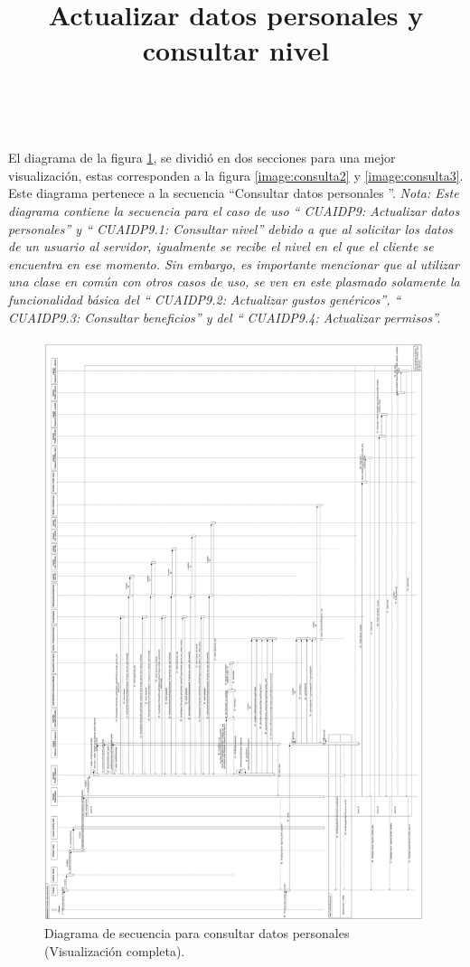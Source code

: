 \title{\textbf{Actualizar datos personales y consultar nivel}}
\\ \par
El diagrama de la figura \ref{image:consulta1}, se dividió en dos secciones para una mejor visualización, estas corresponden a la figura \ref{image:consulta2} y \ref{image:consulta3}. Este diagrama pertenece a la secuencia ``Consultar datos personales ''. 
\textit{Nota: Este diagrama contiene la secuencia para el caso de uso `` CUAIDP9: Actualizar datos personales'' y `` CUAIDP9.1: Consultar nivel'' debido a que al solicitar los datos de un usuario al servidor, igualmente se recibe el nivel en el que el cliente se encuentra en ese momento. Sin embargo, es importante mencionar que al utilizar una clase en común con otros casos de uso, se ven en este plasmado solamente la funcionalidad básica del `` CUAIDP9.2: Actualizar gustos genéricos'', `` CUAIDP9.3: Consultar beneficios'' y del `` CUAIDP9.4: Actualizar permisos''.}
\FloatBarrier
\begin{figure}[htbp!]
		\centering
			\includegraphics[width=.67 \textwidth]{imagenes/Diagramas_UserApp/Nuevos_diagramas/Horizontal/VerPerfil}
		\caption{Diagrama de secuencia para consultar datos personales (Visualización completa).}
		\label{image:consulta1}
\end{figure}
\FloatBarrier

